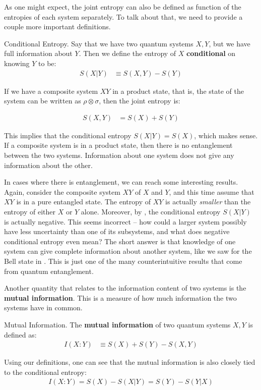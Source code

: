 As one might expect, the joint entropy can also be defined as function of the entropies of each system separately. To talk about that, we need to provide a couple more important definitions.

\begin{definition}{Conditional Entropy.}
    \label{defn:conditional-entropy}
    Say that we have two quantum systems $X,Y$, but we have full information about $Y$. Then we define the entropy of $X$ \textbf{conditional} on knowing $Y$ to be: 
    \begin{align}
        S(X|Y) &\equiv S(X,Y) - S(Y)
    \end{align}
\end{definition}

\begin{example}
    If we have a composite system $XY$ in a product state, that is, the state of the system can be written as $\rho \otimes \sigma$, then the joint entropy is:
\end{example}

\begin{align}
    S(X,Y) &= S(X) + S(Y)
\end{align}

This implies that the conditional entropy $S(X|Y) = S(X)$, which makes sense. If a composite system is in a product state, then there is no entanglement between the two systems. Information about one system does not give any information about the other.

In cases where there is entanglement, we can reach some interesting results. Again, consider the composite system $XY$ of $X$ and $Y$, and this time assume that $XY$ is in a pure entangled state. The entropy of $XY$ is actually \textit{smaller} than the entropy of either $X$ or $Y$ alone. Moreover, by , the conditional entropy $S(X|Y)$ is actually negative. This seems incorrect -- how could a larger system possibly have less uncertainty than one of its subsystems, and what does negative conditional entropy even mean? The short answer is that knowledge of one system can give complete information about another system, like we saw for the Bell state in . This is just one of the many counterintuitive results that come from quantum entanglement.

Another quantity that relates to the information content of two systems is the \textbf{mutual information}. This is a measure of how much information the two systems have in common.

\begin{definition}{Mutual Information.}
    The \textbf{mutual information} of two quantum systems $X,Y$ is defined as:
    \begin{align}
        I(X:Y) &\equiv S(X) + S(Y) - S(X,Y)
    \end{align}
\end{definition}

Using our definitions, one can see that the mutual information is also closely tied to the conditional entropy:
\begin{align}
        I(X:Y) = S(X) - S(X|Y) = S(Y) - S(Y|X)
\end{align}
